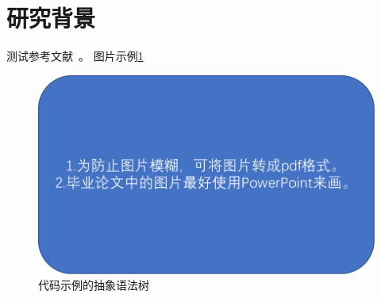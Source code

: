 \section{研究背景}
测试参考文献~\cite{ASE10Rule}。
图片示例\ref{fig:fig1}

\begin{figure}[htb]
	\centering
	\includegraphics[width=\textwidth]{image/fig1.pdf}
	\caption{代码示例的抽象语法树} 
	\label{fig:fig1} 
\end{figure}